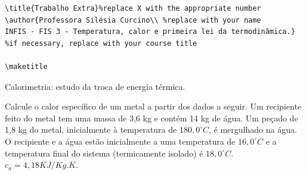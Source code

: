 \documentclass[a4paper, 12pt]{article}
\newenvironment{question}[2][Questão]{\begin{trivlist}
\item[\hskip \labelsep {\bfseries #1}\hskip \labelsep {\bfseries #2.}]}{\end{trivlist}}
\begin{document}
\newcommand{\thedepartment}{Faculdade de Engenharia Elétrica}
\newcommand{\thecourse}{FEELT}
\newcommand{\thetitle}{Temperatura, calor e primeira lei da termodinâmica}
\newcommand{\thetype}{Trabalho Extra da Disciplina de Física III}
\newcommand{\theproftitle}{Bacharel em Física}
\newcommand{\thestudent}{Lesly Viviane Montúfar Berrios\\
\centering11811ETE001}
\newcommand{\theadvisor}{Prof. Silésia Curcino}
\newcommand{\thecity}{Uberlândia}

\thispagestyle{empty} 

\begin{verbatim}
\title{Trabalho Extra}%replace X with the appropriate number
\author{Professora Silésia Curcino\\ %replace with your name
INFIS - FIS 3 - Temperatura, calor e primeira lei da termodinâmica.} %if necessary, replace with your course title

\maketitle
\end{verbatim} 

\begin{question}{1}  Calorimetria: estudo da troca de energia térmica.

Calcule o calor específico de um metal a partir dos dados a seguir. Um recipiente feito do metal tem uma massa de 3,6 kg e contém 14 kg de água. Um peçado de 1,8 kg do metal, inicialmente à temperatura de $180,0^{\circ}C$, é mergulhado na água. O recipiente e a água estão inicialmente a uma temperatura de  $16,0^{\circ}C$ e a temperatura final do sistema (termicamente isolado) é  $18,0^{\circ}C$. $c_a=4,18KJ/Kg.K$.

\end{question}
\end{document}
